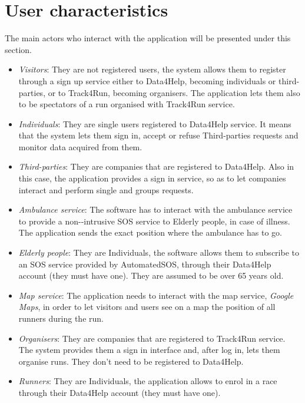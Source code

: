 \section{User characteristics}

The main actors who interact with the application will be presented under this section. 

\begin{itemize}
    \item \emph{Visitors}: They are not registered users, the system allows them to register through a sign up service either to Data4Help, becoming individuals or third-parties, or to Track4Run, becoming organisers. The application lets them also to be spectators of a run organised with Track4Run service. 
    \item \emph{Individuals}: They are single users registered to Data4Help service. It means that the system lets them sign in, accept or refuse Third-parties requests and monitor data acquired from them.
    \item \emph{Third-parties}: They are companies that are registered to Data4Help. Also in this case, the application provides a sign in service, so as to let companies interact and perform single and groups requests. 
    \item \emph{Ambulance service}: The software has to interact with the ambulance service  to provide a non-‐intrusive SOS service to Elderly people, in case of illness. The application sends the exact position where the ambulance has to go.  
    \item \emph{Elderly people}: They are Individuals, the software allows them to subscribe to an SOS service provided by AutomatedSOS, through their Data4Help account (they must have one). They are assumed to be over 65 years old.
    \item \emph{Map service}: The application needs to interact with the map service, \emph{Google Maps}, in order to let visitors and users see on a map the position of all runners during the run.
    \item \emph{Organisers}: They are companies that are registered to Track4Run service. The system provides them a sign in interface and, after log in, lets them organise runs. They don't need to be registered to Data4Help.
    \item \emph{Runners}: They are Individuals, the application allows to enrol in a race through their Data4Help account (they must have one).
\end{itemize}